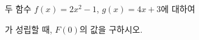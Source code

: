 두 함수 $f(x)=2x^2-1$, $g(x)=4x+3$에 대하여 \par\smallskip{}\par\smallskip\noindent 가 성립할 때, $F(0)$의 값을 구하시오.
